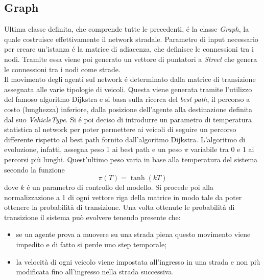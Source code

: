\documentclass[../main.tex]{subfiles}
\begin{document}
\subsection{Graph}
Ultima classe definita, che comprende tutte le precedenti, \'e la classe \emph{Graph}, la quale costruisce effettivamente il network stradale.
Parametro di input necessario per creare un'istanza \'e la matrice di adiacenza, che definisce le connessioni tra i nodi.
Tramite essa viene poi generato un vettore di puntatori a \emph{Street} che genera le connessioni tra i nodi come strade.\\
Il movimento degli agenti sul network \'e determinato dalla matrice di transizione assegnata alle varie tipologie di veicoli.
Questa viene generata tramite l'utilizzo del famoso algoritmo Dijkstra \cite{dijkstra} e si basa sulla ricerca del \emph{best path}, il percorso a costo (lunghezza) inferiore, dalla posizione dell'agente alla destinazione definita dal suo \emph{VehicleType}.
Si \'e poi deciso di introdurre un parametro di temperatura statistica al network per poter permettere ai veicoli di seguire un percorso differente rispetto al best path fornito dall'algoritmo Dijkstra.
L'algoritmo di evoluzione, infatti, assegna peso 1 ai best path e un peso $\pi$ variabile tra 0 e 1 ai percorsi più lunghi.
Quest'ultimo peso varia in base alla temperatura del sistema secondo la funzione
\begin{equation}
    \pi(T)=\tanh(kT)
\end{equation}
dove $k$ \'e un parametro di controllo del modello.
Si procede poi alla normalizzazione a 1 di ogni vettore riga della matrice in modo tale da poter ottenere la probabilità di transizione.
Una volta ottenute le probabilità di transizione il sistema può evolvere tenendo presente che:
\begin{itemize}
    \item se un agente prova a muovere su una strada piena questo movimento viene impedito e di fatto si perde uno step temporale;
    \item la velocità di ogni veicolo viene impostata all'ingresso in una strada e non più modificata fino all'ingresso nella strada successiva. 
\end{itemize}
\end{document}
